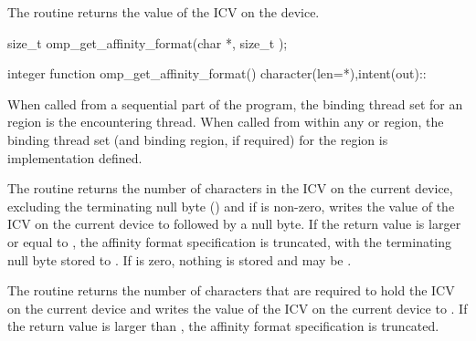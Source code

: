 \summary
The  routine returns the value of the
 ICV on the device.

\format
\begin{ccppspecific}
\begin{ompcFunction}
size_t omp_get_affinity_format(char *, size_t );
\end{ompcFunction}
\end{ccppspecific}

\begin{fortranspecific}
\begin{ompfFunction}
integer function omp_get_affinity_format()
character(len=*),intent(out)::
\end{ompfFunction}
\end{fortranspecific}

\binding
When called from a sequential part of the program, the binding thread 
set for an  region is the encountering 
thread. When called from within any  or  
region, the binding thread set (and binding region, if required) for the 
 region is implementation defined.

\effect
\begin{ccppspecific}
The  routine returns the number of characters
in the  ICV on the current device, excluding 
the terminating null byte () and if  is non-zero, 
writes the value of the  ICV on the current 
device to  followed by a null byte.  If the return value 
is larger or equal to , the affinity format specification is 
truncated, with the terminating null byte stored to 
{}.  If  is zero, nothing 
is stored and  may be .
\end{ccppspecific}

\begin{fortranspecific}
The  routine returns the number of characters 
that are required to hold the  ICV on the current 
device and writes the value of the  ICV on the 
current device to . If the return value is larger than 
{}, the affinity format specification is truncated.
\end{fortranspecific}


